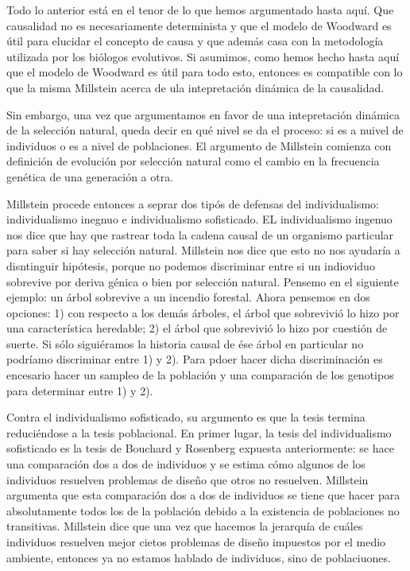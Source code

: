 Todo lo anterior está en el tenor de lo que hemos argumentado hasta aquí. Que causalidad no es necesariamente determinista y que el modelo de Woodward es útil para elucidar el concepto de causa y que además casa con la metodología utilizada por los biólogos evolutivos. Si asumimos, como hemos hecho hasta aquí que el modelo de Woodward es útil para todo esto, entonces es compatible con lo que la misma Millstein acerca de ula intepretación dinámica de la causalidad.

Sin embargo, una vez que argumentamos en favor de una intepretación dinámica de la selección natural, queda decir en qué nivel se da el proceso: si es a nuivel de individuos o es a nivel de poblaciones. El argumento de Millstein comienza con definición de evolución por selección natural como el cambio en la frecuencia genética de una generación a otra.

Millstein procede entonces a seprar dos tipós de defensas del individualismo: individualismo inegnuo e individualismo sofisticado. EL individualismo ingenuo nos dice que hay que rastrear toda la cadena causal de un organismo particular para saber si hay selección natural. Millstein nos dice que esto no nos ayudaría a disntinguir hipótesis, porque no podemos discriminar entre si un indioviduo sobrevive por deriva génica o bien por selección natural. Pensemo en el siguiente ejemplo: un árbol sobrevive a un incendio forestal. Ahora pensemos en dos opciones: 1) con respecto a los demás árboles, el árbol que sobrevivió lo hizo por una característica heredable; 2) el árbol que sobrevivió lo hizo por cuestión de suerte. Si sólo siguiéramos la historia causal de ése árbol en particular no podríamo discriminar entre 1) y 2). Para pdoer hacer dicha discriminación es encesario hacer un sampleo de la población y una comparación de los genotipos para determinar entre 1) y 2).

Contra el individualismo sofisticado, su argumento es que la tesis termina reduciéndose a la tesis poblacional. En primer lugar, la tesis del individualismo sofisticado es la tesis de Bouchard y Rosenberg expuesta anteriormente: se hace una comparación dos a dos de individuos y se estima cómo algunos de los individuos resuelven problemas de diseño que otros no resuelven. Millstein argumenta que esta comparación dos a dos de individuos se tiene que hacer para absolutamente todos los de la población debido a la existencia de poblaciones no transitivas. Millstein dice que una vez que hacemos la jerarquía de cuáles individuos resuelven mejor cietos problemas de diseño impuestos por el medio ambiente, entonces ya no estamos hablado de individuos, sino de poblaciuones.

